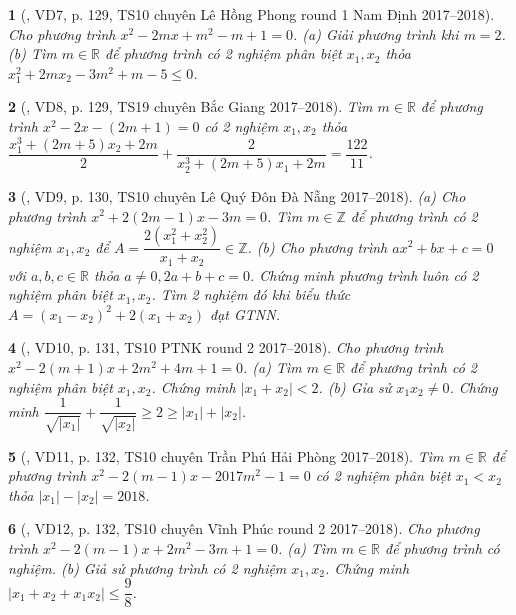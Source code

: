 \documentclass{article}
\newtheorem{baitoan}{}
\begin{document}
\begin{baitoan}[\cite{Thu_Viet_Minh_ptb2}, VD7, p. 129, TS10 chuyên Lê Hồng Phong round 1 Nam Định 2017--2018]
	Cho phương trình $x^2 - 2mx + m^2 - m + 1 = 0$. (a) Giải phương trình khi $m = 2$. (b) Tìm $m\in\mathbb{R}$ để phương trình có 2 nghiệm phân biệt $x_1,x_2$ thỏa $x_1^2 + 2mx_2 - 3m^2 + m - 5\le0$.
\end{baitoan}

\begin{baitoan}[\cite{Thu_Viet_Minh_ptb2}, VD8, p. 129, TS19 chuyên Bắc Giang 2017--2018]
	Tìm $m\in\mathbb{R}$ để phương trình $x^2 - 2x - (2m + 1) = 0$ có 2 nghiệm $x_1,x_2$ thỏa $\dfrac{x_1^3 + (2m + 5)x_2 + 2m}{2} + \dfrac{2}{x_2^3 + (2m + 5)x_1 + 2m} = \dfrac{122}{11}$.
\end{baitoan}

\begin{baitoan}[\cite{Thu_Viet_Minh_ptb2}, VD9, p. 130, TS10 chuyên Lê Quý Đôn Đà Nẵng 2017--2018]
	(a) Cho phương trình $x^2 + 2(2m - 1)x - 3m = 0$. Tìm $m\in\mathbb{Z}$ để phương trình có 2 nghiệm $x_1,x_2$ để $A = \dfrac{2(x_1^2 + x_2^2)}{x_1 + x_2}\in\mathbb{Z}$. (b) Cho phương trình $ax^2 + bx + c = 0$ với $a,b,c\in\mathbb{R}$ thỏa $a\ne0,2a + b + c = 0$. Chứng minh phương trình luôn có 2 nghiệm phân biệt $x_1,x_2$. Tìm 2 nghiệm đó khi biểu thức $A = (x_1 - x_2)^2 + 2(x_1 + x_2)$ đạt {\rm GTNN}.
\end{baitoan}

\begin{baitoan}[\cite{Thu_Viet_Minh_ptb2}, VD10, p. 131, TS10 PTNK round 2 2017--2018]
	Cho phương trình $x^2 - 2(m + 1)x + 2m^2 + 4m + 1 = 0$. (a) Tìm $m\in\mathbb{R}$ để phương trình có 2 nghiệm phân biệt $x_1,x_2$. Chứng minh $\left|x_1 + x_2\right| < 2$. (b) Gỉa sử $x_1x_2\ne0$. Chứng minh $\dfrac{1}{\sqrt{|x_1|}} + \dfrac{1}{\sqrt{|x_2|}}\ge2\ge|x_1| + |x_2|$.
\end{baitoan}

\begin{baitoan}[\cite{Thu_Viet_Minh_ptb2}, VD11, p. 132, TS10 chuyên Trần Phú Hải Phòng 2017--2018]
	Tìm $m\in\mathbb{R}$ để phương trình $x^2 - 2(m - 1)x - 2017m^2 - 1 = 0$ có 2 nghiệm phân biệt $x_1 < x_2$ thỏa $|x_1| - |x_2| = 2018$.
\end{baitoan}

\begin{baitoan}[\cite{Thu_Viet_Minh_ptb2}, VD12, p. 132, TS10 chuyên Vĩnh Phúc round 2 2017--2018]
	Cho phương trình $x^2 - 2(m - 1)x + 2m^2 - 3m + 1 = 0$. (a) Tìm $m\in\mathbb{R}$ để phương trình có nghiệm. (b) Giả sử phương trình có 2 nghiệm $x_1,x_2$. Chứng minh $|x_1 + x_2 + x_1x_2|\le\dfrac{9}{8}$.
\end{baitoan}
\end{document}
